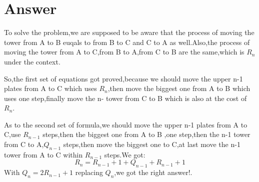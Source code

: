 \documentclass[a4paper]{article}
\begin{document}
\section*{Answer}
To solve the problem,we are supposed to be aware that the process of moving the tower from A to B euqals to from B to C and C to A as well.Also,the process of moving the tower from A to C,from B to A,from C to B are the same,which is $R_{n}$ under the context.\par 
So,the first set of equations got proved,because we should move the upper n-1 plates from A to C which uses $R_{n}$,then move the biggest one from A to B which uses one step,finally move the n-  tower from C to B which is also at the cost of $R_{n}$.\par 
As to the second set of formula,we should move the upper n-1 plates from A to C,use $R_{n-1}$ steps,then the biggest one from A to B ,one step,then the n-1 tower from C to A,$Q_{n-1}$ steps,then move the biggest one to C,at last move the n-1 tower from A to C within $R_{n-1}$ steps.We got:
\begin{equation}
	R_{n}=R_{n-1}+1+Q_{n-1}+R_{n-1}+1
\end{equation}
With $Q_{n}=2R_{n-1}+1$ replacing $Q_{n}$,we got the right answer!.\par 
\end{document}
